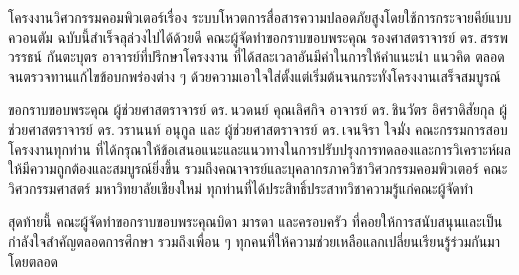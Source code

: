 \begin{acknowledgments}
โครงงานวิศวกรรมคอมพิวเตอร์เรื่อง ระบบโหวตการสื่อสารความปลอดภัยสูงโดยใช้การกระจายคีย์แบบควอนตัม ฉบับนี้สำเร็จลุล่วงไปได้ด้วยดี คณะผู้จัดทำขอกราบขอบพระคุณ รองศาสตราจารย์ ดร.\,สรรพวรรธน์ กันตะบุตร อาจารย์ที่ปรึกษาโครงงาน ที่ได้สละเวลาอันมีค่าในการให้คำแนะนำ แนวคิด ตลอดจนตรวจทานแก้ไขข้อบกพร่องต่าง ๆ ด้วยความเอาใจใส่ตั้งแต่เริ่มต้นจนกระทั่งโครงงานเสร็จสมบูรณ์

\enskip ขอกราบขอบพระคุณ ผู้ช่วยศาสตราจารย์ ดร.\,นวดนย์ คุณเลิศกิจ อาจารย์ ดร.\,ชินวัตร อิศราดิสัยกุล ผู้ช่วยศาสตราจารย์ ดร.\,วรานนท์ อนุกูล และ ผู้ช่วยศาสตราจารย์ ดร.\,เจนจิรา ใจมั่ง คณะกรรมการสอบโครงงานทุกท่าน ที่ได้กรุณาให้ข้อเสนอแนะและแนวทางในการปรับปรุงการทดลองและการวิเคราะห์ผลให้มีความถูกต้องและสมบูรณ์ยิ่งขึ้น รวมถึงคณาจารย์และบุคลากรภาควิชาวิศวกรรมคอมพิวเตอร์ คณะวิศวกรรมศาสตร์ มหาวิทยาลัยเชียงใหม่ ทุกท่านที่ได้ประสิทธิ์ประสาทวิชาความรู้แก่คณะผู้จัดทำ

\enskip สุดท้ายนี้ คณะผู้จัดทำขอกราบขอบพระคุณบิดา มารดา และครอบครัว ที่คอยให้การสนับสนุนและเป็นกำลังใจสำคัญตลอดการศึกษา รวมถึงเพื่อน ๆ ทุกคนที่ให้ความช่วยเหลือแลกเปลี่ยนเรียนรู้ร่วมกันมาโดยตลอด

\end{acknowledgments}%
\fi %

\contentspage

\ifproject
\figurelistpage

\tablelistpage
\fi %



